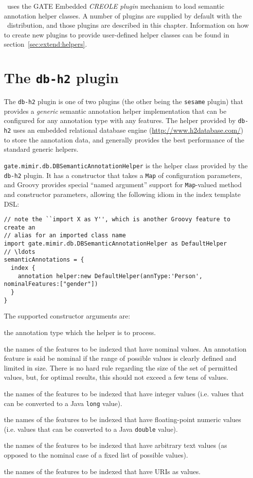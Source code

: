 \Mimir\ uses the GATE Embedded {\em CREOLE plugin} mechanism to load semantic
annotation helper classes.  A number of plugins are supplied by default with
the \Mimir\ distribution, and those plugins are described in this chapter.
Information on how to create new plugins to provide user-defined helper classes
can be found in section~\ref{sec:extend:helpers}.

\section{The {\tt db-h2} plugin}\label{sec:plugins:db}

The {\tt db-h2} plugin is one of two plugins (the other being the {\tt sesame}
plugin) that provides a {\em generic} semantic annotation helper implementation
that can be configured for any annotation type with any features.  The helper
provided by {\tt db-h2} uses an embedded relational database engine
(\url{http://www.h2database.com/}) to store the annotation data, and generally
provides the best performance of the standard generic helpers.

\lstinline!gate.mimir.db.DBSemanticAnnotationHelper! is the helper class
provided by the {\tt db-h2} plugin.  It has a constructor that takes a
{\tt Map} of configuration parameters, and Groovy provides special ``named
argument'' support for {\tt Map}-valued method and constructor parameters,
allowing the following idiom in the index template DSL:
\begin{lstlisting}[texcl, breaklines, breakindent=150pt]
// note the ``import X as Y'', which is another Groovy feature to create an
// alias for an imported class name
import gate.mimir.db.DBSemanticAnnotationHelper as DefaultHelper
// \ldots
semanticAnnotations = {
  index {
    annotation helper:new DefaultHelper(annType:'Person', nominalFeatures:["gender"])
  }
}
\end{lstlisting}

The supported constructor arguments are:
\bde
\item[annType:] the annotation type which the helper is to process.
\item[nominalFeatures:] the names of the features to be indexed that have
  nominal values. An annotation feature is said be nominal if the range of
  possible values is clearly defined and limited in size. There is no hard rule
  regarding the size of the set of permitted values, but, for optimal results,
  this should not exceed a few tens of values.
\item[integerFeatures:] the names of the features to be indexed that have
  integer values (i.e. values that can be converted to a Java {\tt long}
  value).
\item[floatFeatures:] the names of the features to be indexed that have
  floating-point numeric values (i.e. values that can be converted to a Java
  {\tt double} value).
\item[textFeatures:] the names of the features to be indexed that have
  arbitrary text values (as opposed to the nominal case of a fixed list of
  possible values).
\item[uriFeatures:] the names of the features to be indexed that have
  URIs as values.
\ede

